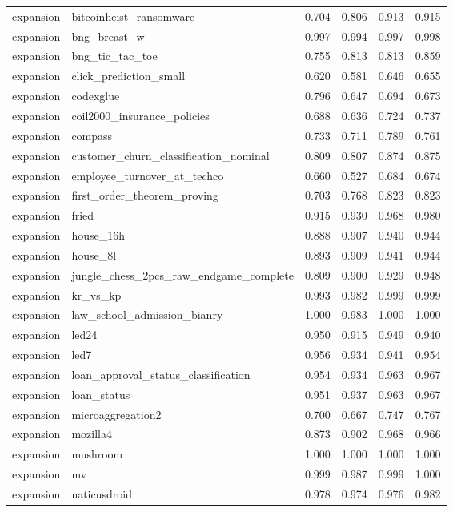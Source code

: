 \begin{table}[htbp]
\begin{adjustbox}{max width=\linewidth}
\begin{tabular}{llrrrr}
expansion & bitcoinheist\_ransomware & 0.704 & 0.806 & 0.913 & 0.915 \\
expansion & bng\_breast\_w & 0.997 & 0.994 & 0.997 & 0.998 \\
expansion & bng\_tic\_tac\_toe & 0.755 & 0.813 & 0.813 & 0.859 \\
expansion & click\_prediction\_small & 0.620 & 0.581 & 0.646 & 0.655 \\
expansion & codexglue & 0.796 & 0.647 & 0.694 & 0.673 \\
expansion & coil2000\_insurance\_policies & 0.688 & 0.636 & 0.724 & 0.737 \\
expansion & compass & 0.733 & 0.711 & 0.789 & 0.761 \\
expansion & customer\_churn\_classification\_nominal & 0.809 & 0.807 & 0.874 & 0.875 \\
expansion & employee\_turnover\_at\_techco & 0.660 & 0.527 & 0.684 & 0.674 \\
expansion & first\_order\_theorem\_proving & 0.703 & 0.768 & 0.823 & 0.823 \\
expansion & fried & 0.915 & 0.930 & 0.968 & 0.980 \\
expansion & house\_16h & 0.888 & 0.907 & 0.940 & 0.944 \\
expansion & house\_8l & 0.893 & 0.909 & 0.941 & 0.944 \\
expansion & jungle\_chess\_2pcs\_raw\_endgame\_complete & 0.809 & 0.900 & 0.929 & 0.948 \\
expansion & kr\_vs\_kp & 0.993 & 0.982 & 0.999 & 0.999 \\
expansion & law\_school\_admission\_bianry & 1.000 & 0.983 & 1.000 & 1.000 \\
expansion & led24 & 0.950 & 0.915 & 0.949 & 0.940 \\
expansion & led7 & 0.956 & 0.934 & 0.941 & 0.954 \\
expansion & loan\_approval\_status\_classification & 0.954 & 0.934 & 0.963 & 0.967 \\
expansion & loan\_status & 0.951 & 0.937 & 0.963 & 0.967 \\
expansion & microaggregation2 & 0.700 & 0.667 & 0.747 & 0.767 \\
expansion & mozilla4 & 0.873 & 0.902 & 0.968 & 0.966 \\
expansion & mushroom & 1.000 & 1.000 & 1.000 & 1.000 \\
expansion & mv & 0.999 & 0.987 & 0.999 & 1.000 \\
expansion & naticusdroid & 0.978 & 0.974 & 0.976 & 0.982 \\

\end{tabular}
\end{adjustbox}
\end{table}
